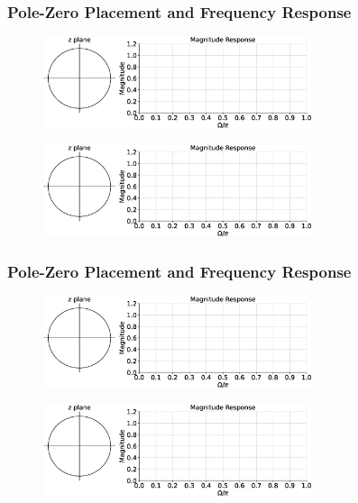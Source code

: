 \documentclass[aspectratio=169]{beamer}
\begin{document}
\begin{frame}[t]
  \frametitle{Pole-Zero Placement and Frequency Response}

  \begin{figure}
  \centering
  \includegraphics[width=0.7\textwidth]{img/freqpz.eps}
  \end{figure}

  \begin{figure}
  \centering
  \includegraphics[width=0.7\textwidth]{img/freqpz.eps}
  \end{figure}
  
\end{frame}


\begin{frame}[t]
  \frametitle{}
  
\end{frame}


\begin{frame}[t]
  \frametitle{Pole-Zero Placement and Frequency Response}

  \begin{figure}
  \centering
  \includegraphics[width=0.7\textwidth]{img/freqpz.eps}
  \end{figure}

  \begin{figure}
  \centering
  \includegraphics[width=0.7\textwidth]{img/freqpz.eps}
  \end{figure}
  
\end{frame}
\end{document}
